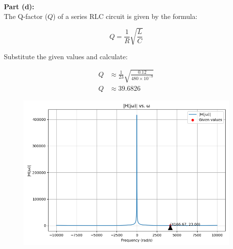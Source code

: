 \documentclass[journal,12pt,twocolumn]{IEEEtran}
\theoremstyle{remark}
\begin{document}
 \textbf{Part (d):}\\
 
The Q-factor (\(Q\)) of a series RLC circuit is given by the formula:

\[Q = \frac{1}{R} \sqrt{\frac{L}{C}} \label{eq:Qfact}\]

Substitute the given values and calculate:

\begin{align}
    Q &\approx \frac{1}{23} \sqrt{\frac{0.12}{480 \times 10^{-9}}} \\
    Q &\approx 39.6826 
\end{align}

\begin{figure}[h!]
  \centering
  \includegraphics[width=\columnwidth]{figs/analog.png}
  \label{fig:bode_Plot}
\end{figure}
\end{document}
